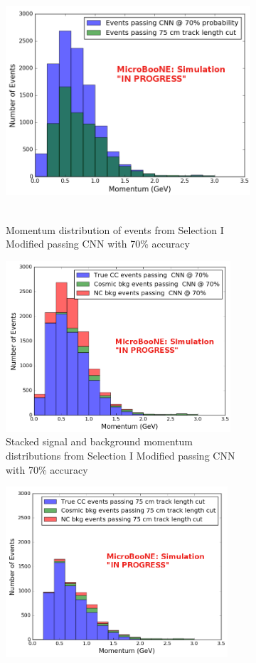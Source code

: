 \begin{figure}[htp!]
\centering
	\begin{subfigure}[b]{.9\textwidth}
	\centering
	\includegraphics[width=\textwidth,height=3.5in]{figs/sel1mod_parP_wrongnorm_acc70_0706.png}
	\caption{Momentum distribution of events from Selection I Modified passing CNN with 70\% accuracy}
	\label{fig:sel1mod_momentum}
	\end{subfigure}
	\quad
	\begin{subfigure}[b]{.45\textwidth}
	\includegraphics[width=\textwidth,height=2.5in]{figs/sel1mod_cnn_parP_stackedevents_0707.png}
	\caption{Stacked signal and background momentum distributions from Selection I Modified passing CNN with 70\% accuracy}
	\label{fig:sel1mod_momentum_stackedcnn}
	\end{subfigure}
	\quad
	\begin{subfigure}[b]{.45\textwidth}
	\includegraphics[width=\textwidth,height=2.5in]{figs/sel1mod_original_parP_stackedevents_0707.png}

\end{subfigure}
\end{figure}
